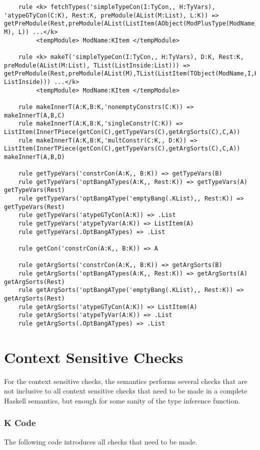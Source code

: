 \begin{lstlisting}
    rule <k> fetchTypes('simpleTypeCon(I:TyCon,, H:TyVars), 'atypeGTyCon(C:K), Rest:K, preModule(AList(M:List), L:K)) => getPreModule(Rest,preModule(AList(ListItem(AObject(ModPlusType(ModName,I),C)) M), L)) ...</k>
         <tempModule> ModName:KItem </tempModule>

    rule <k> makeT('simpleTypeCon(I:TyCon,, H:TyVars), D:K, Rest:K, preModule(AList(M:List), TList(ListInside:List))) => getPreModule(Rest,preModule(AList(M),TList(ListItem(TObject(ModName,I,H,makeInnerT(I,H,D))) ListInside))) ...</k>
         <tempModule> ModName:KItem </tempModule>

    rule makeInnerT(A:K,B:K,'nonemptyConstrs(C:K)) => makeInnerT(A,B,C)
    rule makeInnerT(A:K,B:K,'singleConstr(C:K)) => ListItem(InnerTPiece(getCon(C),getTypeVars(C),getArgSorts(C),C,A))
    rule makeInnerT(A:K,B:K,'multConstr(C:K,, D:K)) => ListItem(InnerTPiece(getCon(C),getTypeVars(C),getArgSorts(C),C,A)) makeInnerT(A,B,D)

    rule getTypeVars('constrCon(A:K,, B:K)) => getTypeVars(B)
    rule getTypeVars('optBangATypes(A:K,, Rest:K)) => getTypeVars(A) getTypeVars(Rest)
    rule getTypeVars('optBangAType('emptyBang(.KList),, Rest:K)) => getTypeVars(Rest)
    rule getTypeVars('atypeGTyCon(A:K)) => .List
    rule getTypeVars('atypeTyVar(A:K)) => ListItem(A)
    rule getTypeVars(.OptBangATypes) => .List

    rule getCon('constrCon(A:K,, B:K)) => A

    rule getArgSorts('constrCon(A:K,, B:K)) => getArgSorts(B)
    rule getArgSorts('optBangATypes(A:K,, Rest:K)) => getArgSorts(A) getArgSorts(Rest)
    rule getArgSorts('optBangAType('emptyBang(.KList),, Rest:K)) => getArgSorts(Rest)
    rule getArgSorts('atypeGTyCon(A:K)) => ListItem(A)
    rule getArgSorts('atypeTyVar(A:K)) => .List
    rule getArgSorts(.OptBangATypes) => .List
\end{lstlisting}

\section{Context Sensitive Checks}
For the context sensitive checks, the semantics performs several checks that are not inclusive to all context sensitive checks that need to be made in a complete Haskell semantics, but enough for some sanity of the type inference function.

\subsubsection{K Code}
The following code introduces all checks that need to be made.


